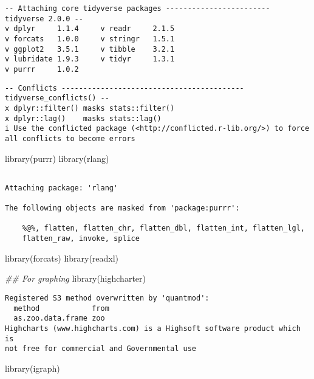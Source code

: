 \documentclass[
  letterpaper,
  DIV=11,
  numbers=noendperiod]{scrartcl}
\newenvironment{Shaded}{\begin{snugshade}}{\end{snugshade}}
\newcommand{\DocumentationTok}[1]{\textcolor[rgb]{0.37,0.37,0.37}{\textit{#1}}}
\newcommand{\FunctionTok}[1]{\textcolor[rgb]{0.28,0.35,0.67}{#1}}
\newcommand{\NormalTok}[1]{\textcolor[rgb]{0.00,0.23,0.31}{#1}}
\begin{document}
\begin{verbatim}
-- Attaching core tidyverse packages ------------------------ tidyverse 2.0.0 --
v dplyr     1.1.4     v readr     2.1.5
v forcats   1.0.0     v stringr   1.5.1
v ggplot2   3.5.1     v tibble    3.2.1
v lubridate 1.9.3     v tidyr     1.3.1
v purrr     1.0.2     
\end{verbatim}

\begin{verbatim}
-- Conflicts ------------------------------------------ tidyverse_conflicts() --
x dplyr::filter() masks stats::filter()
x dplyr::lag()    masks stats::lag()
i Use the conflicted package (<http://conflicted.r-lib.org/>) to force all conflicts to become errors
\end{verbatim}

\begin{Shaded}
\begin{Highlighting}[]
\FunctionTok{library}\NormalTok{(purrr)}
\FunctionTok{library}\NormalTok{(rlang)}
\end{Highlighting}
\end{Shaded}

\begin{verbatim}

Attaching package: 'rlang'

The following objects are masked from 'package:purrr':

    %@%, flatten, flatten_chr, flatten_dbl, flatten_int, flatten_lgl,
    flatten_raw, invoke, splice
\end{verbatim}

\begin{Shaded}
\begin{Highlighting}[]
\FunctionTok{library}\NormalTok{(forcats)}
\FunctionTok{library}\NormalTok{(readxl)}

\DocumentationTok{\#\# For graphing}
\FunctionTok{library}\NormalTok{(highcharter)}
\end{Highlighting}
\end{Shaded}

\begin{verbatim}
Registered S3 method overwritten by 'quantmod':
  method            from
  as.zoo.data.frame zoo 
Highcharts (www.highcharts.com) is a Highsoft software product which is
not free for commercial and Governmental use
\end{verbatim}

\begin{Shaded}
\begin{Highlighting}[]
\FunctionTok{library}\NormalTok{(igraph)}
\end{Highlighting}
\end{Shaded}
\end{document}
